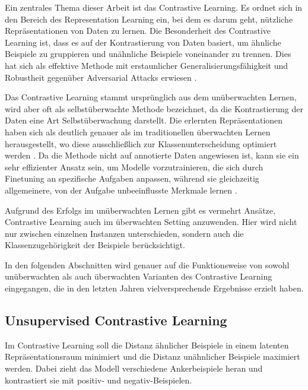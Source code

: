 Ein zentrales Thema dieser Arbeit ist das Contrastive Learning. Es ordnet sich in den Bereich des Representation Learning ein, bei dem es darum geht, nützliche Repräsentationen von Daten zu lernen. Die Besonderheit des Contrastive Learning ist, dass es auf der Kontrastierung von Daten basiert, um ähnliche Beispiele zu gruppieren und unähnliche Beispiele voneinander zu trennen. Dies hat sich als effektive Methode mit erstaunlicher Generalisierungsfähigkeit und Robustheit gegenüber Adversarial Attacks erwiesen \parencite{Liu2021understandimprovecontrastivelearning}.

Das Contrastive Learning stammt ursprünglich aus dem unüberwachten Lernen, wird aber oft als selbstüberwachte Methode bezeichnet, da die Kontrastierung der Daten eine Art Selbstüberwachung darstellt. Die erlernten Repräsentationen haben sich als deutlich genauer als im traditionellen überwachten Lernen herausgestellt, wo diese ausschließlich zur Klassenunterscheidung optimiert werden \parencite{Keshtmand2022contrastood}. Da die Methode nicht auf annotierte Daten angewiesen ist, kann sie ein sehr effizienter Ansatz sein, um Modelle vorzutrainieren, die sich durch Finetuning an spezifische Aufgaben anpassen, während sie gleichzeitig allgemeinere, von der Aufgabe unbeeinflusste Merkmale lernen \parencite{Radford2021learningtransferablevisualmodels}.

Aufgrund des Erfolgs im unüberwachten Lernen gibt es vermehrt Ansätze, Contrastive Learning auch im überwachten Setting anzuwenden. Hier wird nicht nur zwischen einzelnen Instanzen unterschieden, sondern auch die Klassenzugehörigkeit der Beispiele berücksichtigt.

In den folgenden Abschnitten wird genauer auf die Funktionsweise von sowohl unüberwachten als auch überwachten Varianten des Contrastive Learning eingegangen, die in den letzten Jahren vielversprechende Ergebnisse erzielt haben.

\subsection{Unsupervised Contrastive Learning} \label{subsec:unsup-contrastive}

Im Contrastive Learning soll die Distanz ähnlicher Beispiele in einem latenten Repräsentationsraum minimiert und die Distanz unähnlicher Beispiele maximiert werden. Dabei zieht das Modell verschiedene Ankerbeispiele heran und kontrastiert sie mit positiv- und negativ-Beispielen.

